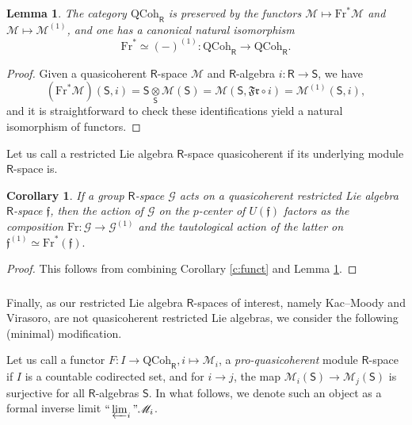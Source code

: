 \documentclass{amsart}
\newtheorem{Cor}[Thm]{Corollary}
\newtheorem{Lem}[Thm]{Lemma}
\theoremstyle{definition}
\newcommand{\sss}{\subsubsection{}}
\newcommand{\fr}{^\on{(1)}}
\newcommand{\Sing}{\mathsf{S}}
\newcommand{\QCoh}{\on{QCoh}}
\newcommand{\sM}{\mathscr{M}}
\newcommand{\on}{\mathrm}
\newcommand{\Ring}{\mathsf{R}}
\newcommand{\ff}{\mathfrak{f}}
\numberwithin{equation}{section}
\begin{document}
\begin{Lem} \label{l:Fr*1} The category $\on{QCoh}_\Ring$ is preserved by the functors $\sM \mapsto \on{Fr}^* \sM$ and $\sM \mapsto \sM\fr$, and one has a canonical natural isomorphism
$$\on{Fr}^* \simeq (-)\fr: \QCoh_\Ring \rightarrow \QCoh_\Ring.$$   
\end{Lem}

\begin{proof} Given a quasicoherent $\Ring$-space $\sM$ and $\Ring$-algebra $i: \Ring \rightarrow \Sing$, we have 
$$(\on{Fr}^* \sM)(\Sing, i) = \Sing \underset{\Sing} \otimes \sM(\Sing) = \sM( \Sing, \mathfrak{Fr} \circ i) = \sM\fr(\Sing, i),$$and it is straightforward to check these identifications yield a natural isomorphism of functors. 
\end{proof}

Let us call a restricted Lie algebra $\Ring$-space quasicoherent if its underlying module $\Ring$-space is. 

\begin{Cor} \label{c:actiononpcenter}If a group $\Ring$-space $\mathscr{G}$ acts on a  quasicoherent restricted Lie algebra $\Ring$-space $\ff$, then the action of $\mathscr{G}$ on the $p$-center of $U(\ff)$ factors as the composition $\on{Fr}: \mathscr{G} \rightarrow \mathscr{G}\fr$ and the tautological action of the latter on $\ff\fr \simeq \on{Fr}^*(\ff).$
\end{Cor}

\begin{proof} This follows from combining Corollary \ref{c:funct} and Lemma \ref{l:Fr*1}. 
\end{proof}


\sss \label{sss_proqcoh} Finally, as our restricted Lie algebra $\Ring$-spaces of interest, namely Kac--Moody and Virasoro, are not quasicoherent restricted Lie algebras, we consider the following (minimal) modification. 

Let us call a functor $F: I \rightarrow \QCoh_\Ring, i \mapsto \sM_i$, a {\em pro-quasicoherent} module $\Ring$-space if $I$ is a countable codirected set, and for $i \rightarrow j$, the map $\sM_i(\Sing) \rightarrow \sM_j(\Sing)$ is surjective for all $\Ring$-algebras $\Sing$. In what follows, we denote such an object as a formal inverse limit $``\varprojlim_i" \sM_i$. 
\end{document}
